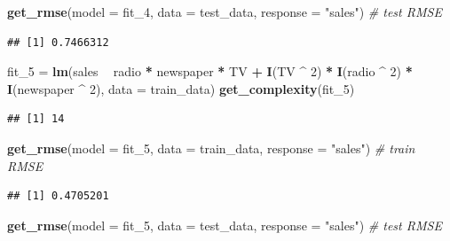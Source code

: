 \documentclass[]{report}
\newenvironment{Shaded}{\begin{snugshade}}{\end{snugshade}}
\newcommand{\KeywordTok}[1]{\textcolor[rgb]{0.13,0.29,0.53}{\textbf{#1}}}
\newcommand{\DataTypeTok}[1]{\textcolor[rgb]{0.13,0.29,0.53}{#1}}
\newcommand{\DecValTok}[1]{\textcolor[rgb]{0.00,0.00,0.81}{#1}}
\newcommand{\StringTok}[1]{\textcolor[rgb]{0.31,0.60,0.02}{#1}}
\newcommand{\CommentTok}[1]{\textcolor[rgb]{0.56,0.35,0.01}{\textit{#1}}}
\newcommand{\OperatorTok}[1]{\textcolor[rgb]{0.81,0.36,0.00}{\textbf{#1}}}
\newcommand{\NormalTok}[1]{#1}
\begin{document}
\begin{Shaded}
\begin{Highlighting}[]
\KeywordTok{get_rmse}\NormalTok{(}\DataTypeTok{model =}\NormalTok{ fit_}\DecValTok{4}\NormalTok{, }\DataTypeTok{data =}\NormalTok{ test_data, }\DataTypeTok{response =} \StringTok{"sales"}\NormalTok{) }\CommentTok{# test RMSE}
\end{Highlighting}
\end{Shaded}

\begin{verbatim}
## [1] 0.7466312
\end{verbatim}

\begin{Shaded}
\begin{Highlighting}[]
\NormalTok{fit_}\DecValTok{5}\NormalTok{ =}\StringTok{ }\KeywordTok{lm}\NormalTok{(sales }\OperatorTok{~}\StringTok{ }\NormalTok{radio }\OperatorTok{*}\StringTok{ }\NormalTok{newspaper }\OperatorTok{*}\StringTok{ }\NormalTok{TV }\OperatorTok{+}
\StringTok{           }\KeywordTok{I}\NormalTok{(TV }\OperatorTok{^}\StringTok{ }\DecValTok{2}\NormalTok{) }\OperatorTok{*}\StringTok{ }\KeywordTok{I}\NormalTok{(radio }\OperatorTok{^}\StringTok{ }\DecValTok{2}\NormalTok{) }\OperatorTok{*}\StringTok{ }\KeywordTok{I}\NormalTok{(newspaper }\OperatorTok{^}\StringTok{ }\DecValTok{2}\NormalTok{), }\DataTypeTok{data =}\NormalTok{ train_data)}
\KeywordTok{get_complexity}\NormalTok{(fit_}\DecValTok{5}\NormalTok{)}
\end{Highlighting}
\end{Shaded}

\begin{verbatim}
## [1] 14
\end{verbatim}

\begin{Shaded}
\begin{Highlighting}[]
\KeywordTok{get_rmse}\NormalTok{(}\DataTypeTok{model =}\NormalTok{ fit_}\DecValTok{5}\NormalTok{, }\DataTypeTok{data =}\NormalTok{ train_data, }\DataTypeTok{response =} \StringTok{"sales"}\NormalTok{) }\CommentTok{# train RMSE}
\end{Highlighting}
\end{Shaded}

\begin{verbatim}
## [1] 0.4705201
\end{verbatim}

\begin{Shaded}
\begin{Highlighting}[]
\KeywordTok{get_rmse}\NormalTok{(}\DataTypeTok{model =}\NormalTok{ fit_}\DecValTok{5}\NormalTok{, }\DataTypeTok{data =}\NormalTok{ test_data, }\DataTypeTok{response =} \StringTok{"sales"}\NormalTok{) }\CommentTok{# test RMSE}
\end{Highlighting}
\end{Shaded}
\end{document}
